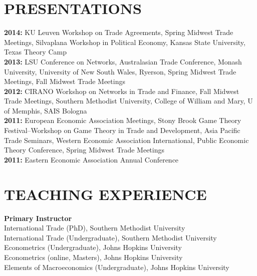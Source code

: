 \documentclass[11pt]{res}
\begin{document}
\begin{resume}
\section{PRESENTATIONS}\vspace{2mm}
{\bf 2014:} KU Leuven Workshop on Trade Agreements, Spring Midwest Trade Meetings, Silvaplana Workshop in Political Economy, Kansas State University, Texas Theory Camp\vspace{2mm}\\
{\bf 2013:} LSU Conference on Networks, Australasian Trade Conference, Monash University, University of New South Wales, Ryerson, Spring Midwest Trade Meetings, Fall Midwest Trade Meetings\vspace{2mm}\\
{\bf 2012:}  CIRANO Workshop on Networks in Trade and Finance, Fall Midwest Trade Meetings, Southern Methodist University, College of William and Mary, U of Memphis, SAIS Bologna\vspace{2mm}\\
{\bf 2011:} European Economic Association Meetings, Stony Brook Game Theory Festival--Workshop on Game Theory in Trade and Development, Asia Pacific Trade Seminars, Western Economic Association International, Public Economic Theory Conference, Spring Midwest Trade Meetings\vspace{2mm}\\
 {\bf 2011:} Eastern Economic Association Annual Conference \vspace{2mm}\\


\section{TEACHING EXPERIENCE} \vspace{3mm}
{\bf Primary Instructor}\vspace{2mm}\\
International Trade (PhD), Southern Methodist University\vspace{1.5mm}\\
International Trade (Undergraduate), Southern Methodist University\vspace{1.5mm}\\
Econometrics (Undergraduate), Johns Hopkins University\vspace{1.5mm}\\
Econometrics (online, Masters), Johns Hopkins University\vspace{1.5mm}\\
Elements of Macroeconomics (Undergraduate), Johns Hopkins University\vspace{1.5mm}\\


\end{resume}
\end{document}
